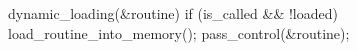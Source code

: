 \documentclass[varwidth=17em,crop]{standalone}
\begin{document}
\begin{ccode}
dynamic_loading(&routine){
  if (is_called && !loaded)
     load_routine_into_memory();
  pass_control(&routine);
}  
\end{ccode}
\end{document}
